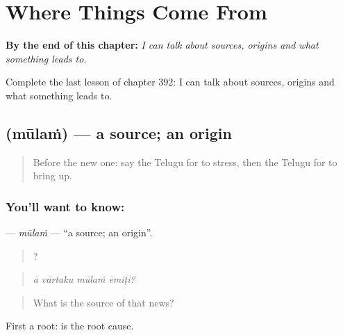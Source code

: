 
\chapter{Where Things Come From}
\label{ch:te-where-things-come-from}

\begin{chapteropening}
\textbf{By the end of this chapter:} \emph{I can talk about sources, origins and what something leads to.}

Complete the last lesson of chapter 392: I can talk about sources, origins and what something leads to.
\end{chapteropening}

\section[\texorpdfstring{\te{మూలం} (mūlaṁ)}{మూలం (mūlaṁ)}]{ (mūlaṁ) — a source; an origin}

\label{lesson:TE-C392-mulam}



\begin{quote}
Before the new one: say the Telugu for to stress, then the Telugu for to bring up.
\end{quote}

\subsection*{You'll want to know: }
\textbf{} — \emph{mūlaṁ} — \textquotedblleft{}a source; an origin\textquotedblright{}.

\begin{quote}
   ?
\end{quote}

\begin{quote}
\emph{ā vārtaku mūlaṁ ēmiṭi?}
\end{quote}

\begin{quote}
What is the source of that news?
\end{quote}

First a root:   is the root cause.

